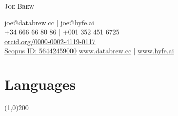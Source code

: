 \documentclass[11pt]{article}
\begin{document}



\thispagestyle{plain}

\begin{center}


\begin{Huge}
\scshape{Joe Brew}\\
\end{Huge}

joe@databrew.cc | joe@hyfe.ai \hfill \\
+34 666 66 80 86 | +001 352 451 6725 \hfill  \\
\href{https://orcid.org/0000-0002-4119-0117}{orcid.org/0000-0002-4119-0117} 
\hfill  \\
\href{http://www.scopus.com/inward/authorDetails.url?authorID=56442459000&partnerID=MN8TOARS}{Scopus ID: 56442459000} \hfill \href{http://databrew.cc}{www.databrew.cc} | \href{https://hyfe.ai}{www.hyfe.ai}\\



\hrulefill


\end{center}


% 
% 
% 
% 


\section*{Languages} %
\vspace{-7mm}
\line(1,0){200}
\vspace{2mm}
\end{document}
